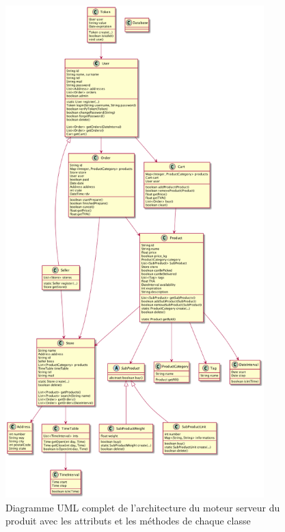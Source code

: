 \documentclass[a4paper, 12pt]{article}
\begin{document}
\begin{figure}[H]
	\begin{center}
		\includegraphics[width=10cm]{fig/uml-all.png}
		\caption*{Diagramme UML complet de l'architecture du moteur serveur du produit avec les attributs et les méthodes de chaque classe}
	\end{center}
\end{figure}
\end{document}
